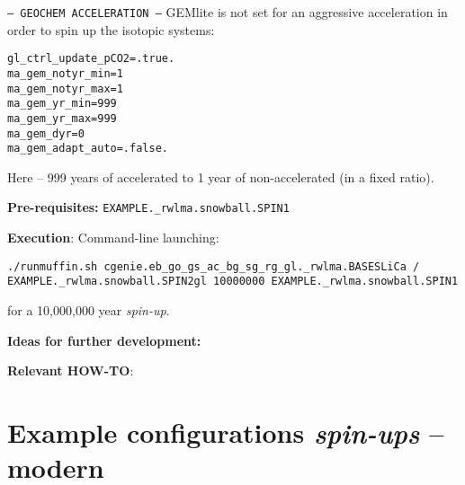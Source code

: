 \documentclass[10pt,twoside]{article}
\begin{document}
\begin{compactitem}
        \item \texttt{--- GEOCHEM ACCELERATION ---}
        GEMlite is not set for an aggressive acceleration in order to spin up the isotopic systems:
                        \vspace{-5pt}\begin{verbatim}
gl_ctrl_update_pCO2=.true.
ma_gem_notyr_min=1
ma_gem_notyr_max=1
ma_gem_yr_min=999
ma_gem_yr_max=999
ma_gem_dyr=0
ma_gem_adapt_auto=.false.
                \end{verbatim}\vspace{-5pt}
                Here -- 999 years of accelerated to 1 year of non-accelerated (in a fixed ratio).
        
\end{compactitem}

\noindent \textbf{Pre-requisites:} 
\texttt{EXAMPLE.\_rwlma.snowball.SPIN1}

\noindent \textbf{Execution}: Command-line launching:
\vspace{-10pt}\begin{verbatim}./runmuffin.sh cgenie.eb_go_gs_ac_bg_sg_rg_gl._rwlma.BASESLiCa /
EXAMPLE._rwlma.snowball.SPIN2gl 10000000 EXAMPLE._rwlma.snowball.SPIN1\end{verbatim}\vspace{-10pt}
for a 10,000,000 year \textit{spin-up}.

\noindent \textbf{Ideas for further development:} 

\noindent \textbf{Relevant HOW-TO}:


\newpage
\section{Example configurations \textit{spin-ups} -- modern}\label{example_spinups_modern}

\end{document}
